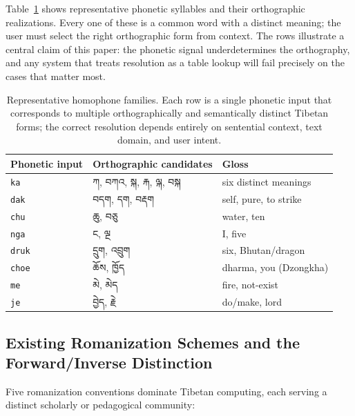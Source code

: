 \documentclass[11pt]{article}
\newcommand{\tib}[1]{{\fontspec{Jomolhari}#1}}
\begin{document}
Table~\ref{tab:homophones} shows representative phonetic syllables and their orthographic realizations. Every one of these is a common word with a distinct meaning; the user must select the right orthographic form from context. The rows illustrate a central claim of this paper: the phonetic signal underdetermines the orthography, and any system that treats resolution as a table lookup will fail precisely on the cases that matter most.

\begin{table}[t]
\centering
\small
\begin{tabular}{lll}
\toprule
Phonetic input & Orthographic candidates & Gloss \\
\midrule
\texttt{ka}  & \tib{ཀ, བཀའ, སྐ, རྐ, ལྐ, བསྐ} & six distinct meanings \\
\texttt{dak} & \tib{བདག, དག, བརྡག} & self, pure, to strike \\
\texttt{chu} & \tib{ཆུ, བཅུ} & water, ten \\
\texttt{nga} & \tib{ང, ལྔ} & I, five \\
\texttt{druk}& \tib{དྲུག, འབྲུག} & six, Bhutan/dragon \\
\texttt{choe}& \tib{ཆོས, ཁྱོད} & dharma, you (Dzongkha) \\
\texttt{me}  & \tib{མེ, མེད} & fire, not-exist \\
\texttt{je}  & \tib{བྱེད, རྗེ} & do/make, lord \\
\bottomrule
\end{tabular}
\caption{Representative homophone families. Each row is a single phonetic input that corresponds to multiple orthographically and semantically distinct Tibetan forms; the correct resolution depends entirely on sentential context, text domain, and user intent.}
\label{tab:homophones}
\end{table}

\subsection{Existing Romanization Schemes and the Forward/Inverse Distinction}
\label{sec:existing-schemes}

Five romanization conventions dominate Tibetan computing, each serving a distinct scholarly or pedagogical community:
\end{document}
